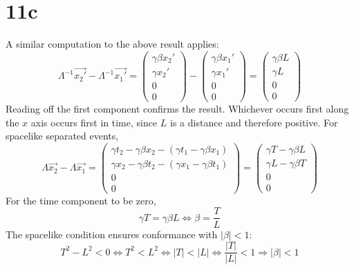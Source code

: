 \documentclass{article}
\begin{document}
\section*{11c}
A similar computation to the above result applies:
\[
  \Lambda^{-1}\vec{x_{2}'}-\Lambda^{-1}\vec{x_{1}'}
  =
  \begin{pmatrix}
    \gamma\beta x_{2}' \\
    \gamma x_{2}' \\
    0 \\
    0
  \end{pmatrix}
  -
  \begin{pmatrix}
    \gamma\beta x_{1}' \\
    \gamma x_{1}' \\
    0 \\
    0
  \end{pmatrix}
  =
  \begin{pmatrix}
    \gamma\beta L \\
    \gamma L \\
    0 \\
    0
  \end{pmatrix}
\]
Reading off the first component confirms the result.
Whichever occurs first along the $x$ axis occurs first in time, since $L$ is a distance and therefore positive.
For spacelike separated events,
\[
  \Lambda \vec{x_{2}}-\Lambda \vec{x_{1}}
  =
  \begin{pmatrix}
    \gamma t_{2}-\gamma\beta x_{2} - (\gamma t_{1}-\gamma\beta x_{1}) \\
    \gamma x_{2}-\gamma\beta t_{2} - (\gamma x_{1}-\gamma\beta t_{1}) \\
    0 \\
    0
  \end{pmatrix}
  =
  \begin{pmatrix}
    \gamma T-\gamma\beta L \\
    \gamma L - \gamma\beta T \\
    0 \\
    0
  \end{pmatrix}
\]
For the time component to be zero,
\[
  \gamma T=\gamma\beta L
  \Leftrightarrow \beta = \frac{T}{L}
\]
The spacelike condition ensures conformance with $|\beta|<1$:
\[
  T^{2}-L^{2}<0
  \Leftrightarrow T^{2}<L^{2}
  \Leftrightarrow |T|<|L|
  \Leftrightarrow \frac{|T|}{|L|}<1
  \Rightarrow |\beta| < 1
\]
\end{document}

